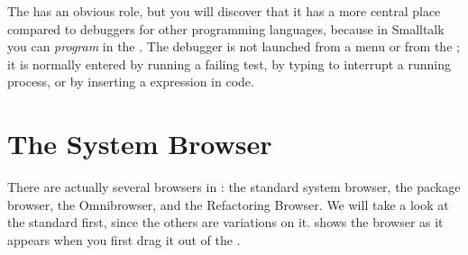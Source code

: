 \documentclass[a4paper,10pt,twoside]{book}
\begin{document}
The  has an obvious role, but you will discover that it has a more central place compared to debuggers for other programming languages, because in Smalltalk you can \emph{program} in the .  The debugger is not launched from a menu or from the \toolsflap; it is normally entered by running a failing test, by typing  to interrupt a running process, or by inserting a  expression in code.





\section{The System Browser}
\label{sec:browser} %

There are actually several browsers in \sq: the standard system browser, the package browser, the Omnibrowser, and the Refactoring Browser. 
We will take a look at the standard  first, since the others are variations on it.
 shows the browser as it appears when you first drag it out of the \toolsflapind.
\end{document}
